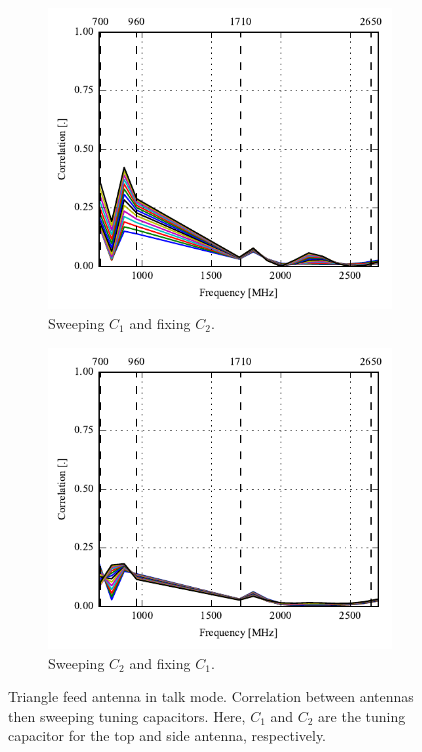 \begin{figure}[htbp]
    \centering
    \begin{subfigure}{0.49\linewidth}
        \includegraphics{img/tech_sol/trianglefeed/talk_mode/correlation_Csh1-sweep}
        \caption{Sweeping $C_1$ and fixing $C_2$.}
    \end{subfigure}
    \hfill
    \begin{subfigure}{0.49\linewidth}
        \includegraphics{img/tech_sol/trianglefeed/talk_mode/correlation_Csh2-sweep}
        \caption{Sweeping $C_2$ and fixing $C_1$.}
    \end{subfigure}
    \caption{Triangle feed antenna in talk mode. Correlation between antennas then sweeping tuning capacitors. Here, $C_1$ and $C_2$ are the tuning capacitor for the top and side antenna, respectively.}
    \label{fig:corr_sol2_talk}
\end{figure}


